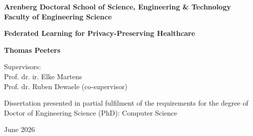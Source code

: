 \begin{titlepage}
\raggedright
{\small\bfseries Arenberg Doctoral School of Science, Engineering \& Technology\\
Faculty of Engineering Science}\par
\vspace{1.3in}
{\LARGE\bfseries Federated Learning for Privacy-Preserving Healthcare\par}
\vspace{0.4in}
{\large\bfseries Thomas Peeters\par}
\vspace{0.8in}
\begin{minipage}[t]{0.45\linewidth}
Supervisors:\\
Prof. dr. ir. Elke Martens\\
Prof. dr. Ruben Dewaele (co-supervisor)
\end{minipage}\hfill
\begin{minipage}[t]{0.5\linewidth}
Dissertation presented in partial fulfilment of the requirements for the degree of
Doctor of Engineering Science (PhD): Computer Science
\end{minipage}\par
\vfill
\centering June 2026
\end{titlepage}
